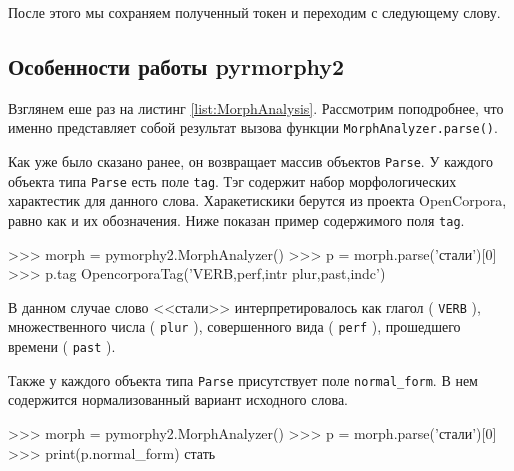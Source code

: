 После этого мы сохраняем полученный токен и переходим с следующему слову.

\subsection{Особенности работы pyrmorphy2}
Взглянем еше раз на листинг \ref{list:MorphAnalysis}. Рассмотрим поподробнее, что именно представляет собой результат вызова функции \lstinline{MorphAnalyzer.parse()}. 

Как уже было сказано ранее, он возвращает массив объектов \lstinline{Parse}. У каждого объекта типа \lstinline{Parse} есть поле \lstinline{tag}. Тэг содержит набор морфологических характестик для данного слова. Харакетискики берутся из проекта OpenCorpora, равно как и их обозначения. Ниже показан пример содержимого поля \lstinline{tag}.
\begin{Verb}
>>> morph = pymorphy2.MorphAnalyzer()
>>> p = morph.parse('стали')[0]
>>> p.tag
OpencorporaTag('VERB,perf,intr plur,past,indc')
\end{Verb}
В данном случае слово <<стали>> интерпретировалось как глагол ( \lstinline{VERB} ), множественного числа ( \lstinline{plur} ), совершенного вида ( \lstinline{perf} ), прошедшего времени ( \lstinline{past} ).

Также у каждого объекта типа \lstinline{Parse} присутствует поле \lstinline{normal_form}. В нем содержится нормализованный вариант исходного слова.
\begin{Verb}
>>> morph = pymorphy2.MorphAnalyzer()
>>> p = morph.parse('стали')[0]
>>> print(p.normal_form)
стать
\end{Verb}

